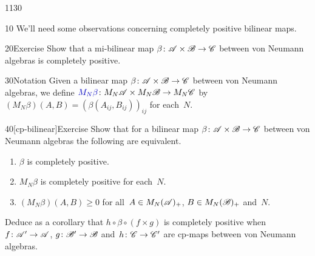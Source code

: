 \begin{parsec}{1130}%
\begin{point}{10}%
%
We'll need some observations
concerning completely positive bilinear maps.
\end{point}
\begin{point}{20}{Exercise}%
Show that a mi-bilinear
map $\beta\colon \mathscr{A}\times\mathscr{B}\to\mathscr{C}$ between von Neumann 
algebras is completely positive.
\end{point}
\begin{point}{30}{Notation}%
Given a bilinear map
$\beta\colon \mathscr{A}\times\mathscr{B}\to\mathscr{C}$
between von Neumann algebras,
we define
$\Define{M_N\beta}\colon M_N\scrA\times M_N\scrB\to M_N\scrC$
by  $(M_N\beta)(A,B) = 
(\beta(A_{ij},B_{ij}))_{ij}$%
for each~$N$.
\end{point}
\begin{point}{40}[cp-bilinear]{Exercise}%
Show that for a bilinear map $\beta\colon \mathscr{A}\times\mathscr{B}\to\mathscr{C}$
between von Neumann algebras
the following are equivalent.
\begin{enumerate}
\item
$\beta$ is completely positive.
\item
$M_N\beta$ is completely positive
for each~$N$.
\item
$(M_N\beta)(A,B)\geq 0$
for all~$A\in M_N(\mathscr{A})_+$, $B\in M_N(\mathscr{B})_+$ and~$N$.
\end{enumerate}
Deduce 
as a corollary that $h\circ \beta \circ (f\times g)$
is completely positive
when~$f\colon \mathscr{A}'\to\mathscr{A}$,
$g\colon \mathscr{B}'\to\mathscr{B}$
and~$h\colon \mathscr{C}\to\mathscr{C}'$
are cp-maps between von Neumann algebras.
\end{point}
\end{parsec}
